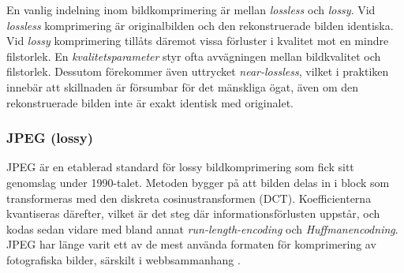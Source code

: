 
En vanlig indelning inom bildkomprimering är mellan \emph{lossless} och \emph{lossy}. 
Vid \emph{lossless} komprimering är originalbilden och den rekonstruerade bilden identiska. 
Vid \emph{lossy} komprimering tillåts däremot vissa förluster i kvalitet mot en mindre filstorlek. En 
\emph{kvalitetsparameter} styr ofta avvägningen mellan bildkvalitet och filstorlek. 
Dessutom förekommer även uttrycket \emph{near-lossless}, vilket i praktiken innebär att skillnaden är 
försumbar för det mänskliga ögat, även om den rekonstruerade bilden inte är exakt identisk 
med originalet.


\subsubsection*{JPEG (lossy)}
JPEG är en etablerad standard för lossy bildkomprimering som fick sitt genomslag 
under 1990-talet. Metoden bygger på att bilden delas in i block som transformeras med den 
diskreta cosinustransformen (DCT). Koefficienterna kvantiseras därefter, vilket är det steg 
där informationsförlusten uppstår, och kodas sedan vidare med bland annat \textit{run-length-encoding} 
och \textit{Huffmanencodning}. JPEG har länge varit ett av de mest använda formaten för komprimering av 
fotografiska bilder, särskilt i webbsammanhang \cite[kap.~8]{gonzalez2017digital-global}.


